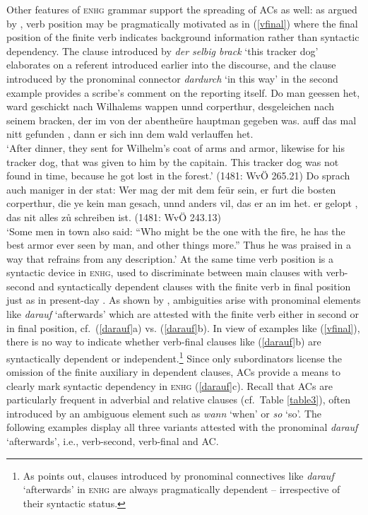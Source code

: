 \documentclass[output=paper,colorlinks,citecolor=brown]{langscibook}
\begin{document}
Other features of \textsc{enhg} grammar support the spreading of ACs as well: as argued by \citet{demske2018}, verb position may be pragmatically motivated as in (\ref{vfinal}) where the final position of the finite verb indicates background information rather than syntactic dependency. The clause introduced by \textit{der selbig brack} `this tracker dog' elaborates on a referent introduced earlier into the discourse, and the clause introduced by the pronominal connector \textit{dardurch} `in this way' in the second example provides a scribe's comment on the reporting itself. 
\eal \label{vfinal}
\ex Do man geessen het, ward geschickt nach Wilhalems wappen unnd corperthur, desgeleichen nach seinem bracken, der im von der abentheüre hauptman gegeben was.  auff das mal nitt gefunden , dann er sich inn dem wald verlauffen het. \\ 
`After dinner, they sent for Wilhelm's coat of arms and armor, likewise for his tracker dog, that was given to him by the capitain. This tracker dog was not found in time, because he got lost in the forest.'  \hfill (1481: WvÖ 265.21)
\ex Do sprach auch maniger in der stat: \glqq Wer mag der mit dem feür sein, er furt die bosten corperthur, die ye kein man gesach, unnd anders vil, das er an im het.\grqq {}  er gelopt , das nit alles z\r{u} schreiben ist. \hfill  (1481: WvÖ 243.13) \\
`Some men in town also said: ``Who might be the one with the fire, he has the best armor ever seen by man, and other things more.'' {} Thus he was praised in a way that refrains from any description.’
\zl
At the same time verb position is a syntactic device in \textsc{enhg}, used to discriminate between
main clauses with verb-second and syntactically dependent clauses with the finite verb in final
position just as in present-day . As shown by \textcite{demske2018}, ambiguities arise with
pronominal elements like \textit{darauf} `afterwards' which are attested with the finite verb either
in second or in final position, cf.\ (\ref{darauf}a) vs. (\ref{darauf}b). In view of examples like
(\ref{vfinal}), there is no way to indicate whether verb-final clauses like (\ref{darauf}b) are
syntactically dependent or independent.\footnote{As \citet{loetscher2000} points out, clauses
  introduced by pronominal connectives like \textit{darauf} `afterwards' in \textsc{enhg} are always
  pragmatically dependent -- irrespective of their syntactic status.} Since only subordinators
license the omission of the finite auxiliary in dependent clauses, ACs provide a means to clearly
mark syntactic dependency in \textsc{enhg} (\ref{darauf}c). Recall that ACs are particularly
frequent in adverbial and relative clauses (cf.\ Table \ref{table3}), often introduced by an
ambiguous element such as \textit{wann} `when' or \textit{so} `so'. The following examples display
all three variants attested with the pronominal \textit{darauf} `afterwards', i.e., verb-second,
verb-final and AC.
\end{document}
